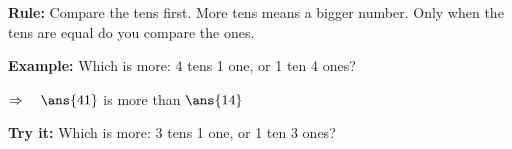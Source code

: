 \documentclass[12pt]{article}
\begin{document}

\begin{formulabox}
\textbf{Rule:} Compare the tens first. More tens means a bigger number. Only
when the tens are equal do you compare the ones.
\end{formulabox}

\begin{examplebox}
\textbf{Example:} \quad Which is more: 4 tens 1 one, or 1 ten 4 ones?

$\Rightarrow\quad \ans{41}$ is more than $\ans{14}$
\end{examplebox}

\begin{tryitbox}
\textbf{Try it:} \quad Which is more: 3 tens 1 one, or 1 ten 3 ones?\\[2pt]
\end{tryitbox}
\end{document}
